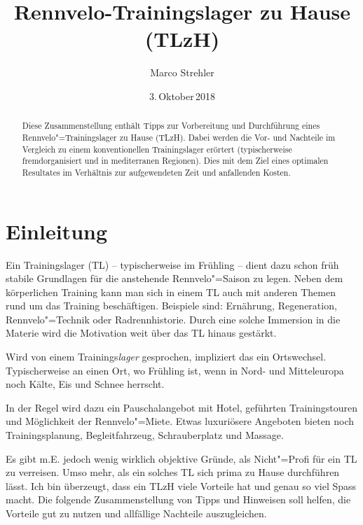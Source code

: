\documentclass[a4paper,DIV13,BCOR0cm,draft=TRUE]{scrartcl}
\newcommand{\rv}{Rennvelo}
\newcommand{\tlzh}{TLzH}
\newcommand{\Tlzh}{Trainingslager zu Hause}
\begin{document}
\renewcommand*\contentsname{Inhalt} %
\renewcommand*\refname{Quellen} %

\lhead{\tlzh}

\title{\rv-\Tlzh{} (\tlzh)}
\author{Marco Strehler}

\date{3.\,Oktober\,2018}

\maketitle

\begin{abstract}
Diese Zusammenstellung enthält Tipps zur Vorbereitung und Durchführung eines \rv"=Trainingslager zu Hause (\tlzh).
Dabei werden die Vor- und Nachteile im Vergleich zu einem konventionellen Trainingslager erörtert
(typischerweise fremdorganisiert und in mediterranen Regionen). 
Dies mit dem Ziel eines optimalen Resultates im Verhältnis zur aufgewendeten Zeit und anfallenden Kosten.
\end{abstract}

\tableofcontents
\section{Einleitung}

Ein Trainingslager (TL) -- typischerweise im Frühling -- dient dazu
schon früh stabile Grundlagen für die anstehende \rv"=Saison zu legen.
Neben dem körperlichen Training kann man sich in einem TL auch mit anderen Themen rund um das Training beschäftigen.
Beispiele sind: Ernährung, Regeneration, \rv"=Technik oder Radrennhistorie.
Durch eine solche Immersion in die Materie wird die Motivation weit über das TL hinaus gestärkt.

Wird von einem Trainings\textsl{lager} gesprochen, impliziert das ein Ortswechsel.
Typischerweise an einen Ort, wo Frühling ist, wenn in Nord- und Mitteleuropa noch Kälte, Eis und Schnee herrscht.

In der Regel wird dazu ein Pauschalangebot mit Hotel, geführten Trainingstouren und Möglichkeit der \rv"=Miete.
Etwas luxuriösere Angeboten bieten noch Trainingsplanung, Begleitfahrzeug, Schrauberplatz und Massage.

Es gibt m.E. jedoch wenig wirklich objektive Gründe, als Nicht"=Profi für ein TL zu verreisen.
Umso mehr, als ein solches TL sich prima zu Hause durchführen lässt.
Ich bin überzeugt, dass ein \tlzh{} viele Vorteile hat und genau so viel Spass macht.
Die folgende Zusammenstellung von Tipps und Hinweisen soll helfen, die Vorteile gut zu nutzen und allfällige Nachteile
auszugleichen.
\end{document}

